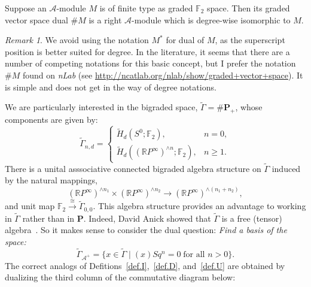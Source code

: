 \documentclass{amsart}
\theoremstyle{plain}
\theoremstyle{definition}
\theoremstyle{remark}
\newtheorem{remark}[theorem]{Remark}
\begin{document}
Suppose an $\mathcal{A}$-module $M$ is of finite type as graded ${\mathbb{F}}_2$
space.  Then its graded vector space dual $\#M$ is a right
$\mathcal{A}$-module which is degree-wise isomorphic to $M$.
\begin{remark}
  We avoid using the notation $M^*$ for dual of $M$, as the
  superscript position is better suited for degree.  In the
  literature, it seems that there are a number of competing notations
  for this basic concept, but I prefer the notation $\#M$ found on
  {\it nLab} (see
  \url{http://ncatlab.org/nlab/show/graded+vector+space}).  It is
  simple and does not get in the way of degree notations.
\end{remark}
We are particularly interested in the bigraded space,
$\widetilde{\Gamma} = \#\mathbf{P}_+$, whose components are given by:
\[
  \widetilde{\Gamma}_{n,d} = \left\{\begin{array}{ll}
  \widetilde{H}_d(S^0; {\mathbb{F}}_2), & n=0, \\ \widetilde{H}_d(({\mathbb{R}}
  P^{\infty})^{\wedge n}; {\mathbb{F}}_2), & n \geq 1.\end{array}\right.
\]
There is a unital asssociative connected bigraded algebra structure on
$\widetilde{\Gamma}$ induced by the natural mappings,
\[
  ({\mathbb{R}} P^{\infty})^{\wedge n_1} \times ({\mathbb{R}} P^{\infty})^{\wedge n_2} \to
  ({\mathbb{R}} P^{\infty})^{\wedge (n_1+n_2)},
\]
and unit map ${\mathbb{F}}_2 \stackrel{\cong}{\to} \widetilde{\Gamma}_{0,0}$.
This algebra structure provides an advantage to working in
$\widetilde{\Gamma}$ rather than in $\mathbf{P}$.  Indeed, David Anick
showed that $\widetilde{\Gamma}$ is a free (tensor) algebra~\cite{A1}.
So it makes sense to consider the dual question: {\it Find a basis of
  the space:}
\[
  \widetilde{\Gamma}_{\mathcal{A}^+} = \{ x \in \widetilde{\Gamma}
  \;|\; (x)Sq^n = 0\; \textrm{for all $n > 0$}\}.
\]
The correct analogs of
Defitions~\ref{def.I},~\ref{def.D}, and~\ref{def.U}
are obtained by dualizing the third column of the commutative
diagram below:
\end{document}
